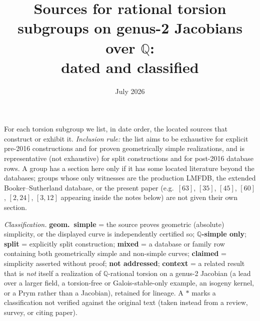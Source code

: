 \documentclass[10pt]{amsart}
\title{Sources for rational torsion subgroups on genus-2 Jacobians over $\mathbb{Q}$:\\
dated and classified}
\date{July 2026}
\begin{document}
\maketitle
\noindent For each torsion subgroup we list, in date order, the located sources
that construct or exhibit it.  \emph{Inclusion rule:} the list aims to be
exhaustive for explicit pre-2016 constructions and for proven geometrically
simple realizations, and is representative (not exhaustive) for split
constructions and for post-2016 database rows.  A group has a section here only
if it has some located literature beyond the databases; groups whose only
witnesses are the production LMFDB, the extended Booker--Sutherland database, or
the present paper (e.g.\ $[63]$, $[35]$, $[45]$, $[60]$, $[2,24]$, $[3,12]$
appearing inside the notes below) are not given their own section.

\emph{Classification.} \textbf{geom.\ simple} = the source proves geometric
(absolute) simplicity, or the displayed curve is independently certified so;
\textbf{$\mathbb{Q}$-simple only}; \textbf{split} = explicitly split
construction; \textbf{mixed} = a database or family row containing both
geometrically simple and non-simple curves; \textbf{claimed} = simplicity
asserted without proof; \textbf{not addressed}; \textbf{context} = a related
result that is \emph{not} itself a realization of $\mathbb{Q}$-rational torsion
on a genus-2 Jacobian (a lead over a larger field, a torsion-free or Galois-stable-only
example, an isogeny kernel, or a Prym rather than a Jacobian), retained for
lineage.  A $*$ marks a classification not verified against the original text
(taken instead from a review, survey, or citing paper).
\medskip
\end{document}
